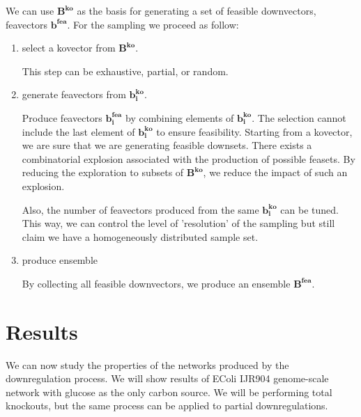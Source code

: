 \documentclass[11pt, letterpaper]{article}
\newcommand{\vecsym}[1]{\boldsymbol{#1}}
\begin{document}
We can use $\vecsym{B^{ko}}$ as the basis for generating a set of feasible downvectors, feavectors $\vecsym{b^{fea}}$.
For the sampling we proceed as follow:


\begin{enumerate}[i]
  
   \item select a kovector from $\vecsym{B^{ko}}$.
       \label{item:select-kovector}
      
       This step can be exhaustive, partial, or random.
      
   \item generate feavectors from $\vecsym{b^{ko}_i}$.
       \label{item:select-feavector}
      
       Produce feavectors $\vecsym{b^{fea}_i}$ by combining elements of $\vecsym{b^{ko}_i}$.
       The selection cannot include the last element of $\vecsym{b^{ko}_i}$ to ensure feasibility.
       Starting from a kovector, we are sure that we are generating feasible downsets.
       There exists a combinatorial explosion associated with the production of possible feasets.
       By reducing the exploration to subsets of $\vecsym{B^{ko}}$, we reduce the impact of such an explosion.
      
       Also, the number of feavectors produced from the same $\vecsym{b^{ko}_i}$ can be tuned.
       This way, we can control the level of 'resolution' of the sampling but still claim we have a homogeneously distributed sample set. 


   \item produce ensemble
  
   By collecting all feasible downvectors, we produce an ensemble $\vecsym{B^{fea}}$.


\end{enumerate}




\section{Results}


We can now study the properties of the networks produced by the downregulation process.
We will show results of EColi IJR904 genome-scale network with glucose as the only carbon source.
We will be performing total knockouts, but the same process can be applied to partial downregulations.
\end{document}
